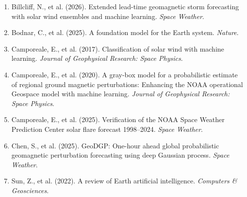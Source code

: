 \documentclass{article}
\begin{document}
\begin{enumerate}
    \item Billcliff, N., et al. (2026). Extended lead-time geomagnetic storm forecasting with solar wind ensembles and machine learning. \textit{Space Weather}.
 
    \item Bodnar, C., et al. (2025). A foundation model for the Earth system. \textit{Nature}.
 
    \item Camporeale, E., et al. (2017). Classification of solar wind with machine learning. \textit{Journal of Geophysical Research: Space Physics}.
 
    \item Camporeale, E., et al. (2020). A gray-box model for a probabilistic estimate of regional ground magnetic perturbations: Enhancing the NOAA operational Geospace model with machine learning. \textit{Journal of Geophysical Research: Space Physics}.
 
    \item Camporeale, E., et al. (2025). Verification of the NOAA Space Weather Prediction Center solar flare forecast 1998--2024. \textit{Space Weather}.
 
    \item Chen, S., et al. (2025). GeoDGP: One-hour ahead global probabilistic geomagnetic perturbation forecasting using deep Gaussian process. \textit{Space Weather}.
 
    \item Sun, Z., et al. (2022). A review of Earth artificial intelligence. \textit{Computers \& Geosciences}.
\end{enumerate}
\end{document}
